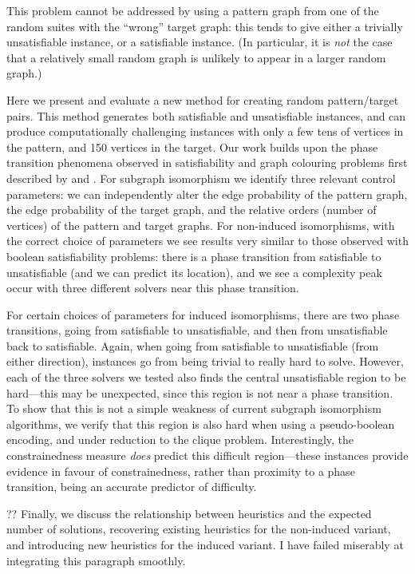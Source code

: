 \documentclass[letterpaper]{article}
\begin{document}
This problem cannot be addressed by using a pattern graph from one of the random suites with the
``wrong'' target graph: this tends to give either a trivially unsatisfiable instance, or a
satisfiable instance. (In particular, it is \emph{not} the case that a relatively small random graph
is unlikely to appear in a larger random graph.)

Here we present and evaluate a new method for creating random pattern/target pairs. This method
generates both satisfiable and unsatisfiable instances, and can produce computationally challenging
instances with only a few tens of vertices in the pattern, and 150 vertices in the target. Our work
builds upon the phase transition phenomena observed in satisfiability and graph colouring problems
first described by \citet{Cheeseman:1991} and \citet{Mitchell:1992}.  For subgraph isomorphism we
identify three relevant control parameters: we can independently alter the edge probability of the
pattern graph, the edge probability of the target graph, and the relative orders (number of
vertices) of the pattern and target graphs.  For non-induced isomorphisms, with the correct choice
of parameters we see results very similar to those observed with boolean satisfiability problems:
there is a phase transition from satisfiable to unsatisfiable (and we can predict its location), and
we see a complexity peak occur with three different solvers near this phase transition.

For certain choices of parameters for induced isomorphisms, there are two phase transitions, going
from satisfiable to unsatisfiable, and then from unsatisfiable back to satisfiable. Again, when
going from satisfiable to unsatisfiable (from either direction), instances go from being trivial to
really hard to solve. However, each of the three solvers we tested also finds the central
unsatisfiable region to be hard---this may be unexpected, since this region is not near a phase
transition. To show that this is not a simple weakness of current subgraph isomorphism algorithms,
we verify that this region is also hard when using a pseudo-boolean encoding, and under reduction to
the clique problem. Interestingly, the constrainedness measure \citep{Gent:1996:Kappa} \emph{does}
predict this difficult region---these instances provide evidence in favour of constrainedness,
rather than proximity to a phase transition, being an accurate predictor of difficulty.

?? Finally, we discuss the relationship between heuristics and the expected number of solutions,
recovering existing heuristics for the non-induced variant, and introducing new heuristics for the
induced variant. I have failed miserably at integrating this paragraph smoothly.
\end{document}

